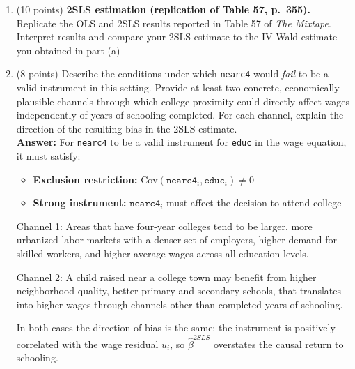 \documentclass[letterpaper,12pt]{article}
\begin{document}
\begin{enumerate}[label=(\alph*)]
\begin{enumerate}[label=(\roman*)]
    \item Using the first-stage regression from (i), report the $F$-statistic on \texttt{nearc4} and comment on whether the instrument appears \textbf{weak}. \\
\textbf{Answer:}
The $F$-statistic on \texttt{nearc4} is approximately $F \approx 15$, exceeding the conventional threshold of $10$.

\end{enumerate}

\item (10 points) \textbf{2SLS estimation (replication of Table 57, p.\ 355).}
Replicate the OLS and 2SLS results reported in Table 57 of \textit{The Mixtape}. Interpret results and compare your 2SLS estimate to the IV-Wald estimate you obtained in part (a)



\item (8 points) Describe the conditions under which \texttt{nearc4} would \emph{fail} to be a valid instrument in this setting. Provide at least two concrete, economically plausible channels through which college proximity could directly affect wages independently of years of schooling completed. For each channel, explain the direction of the resulting bias in the 2SLS estimate.\\
\textbf{Answer:}
\medskip
For \texttt{nearc4} to be a valid instrument for \texttt{educ} in the wage equation, it must satisfy:
\begin{itemize}
    \item \textbf{Exclusion restriction:} $\text{Cov}(\texttt{nearc4}_i, \texttt{educ}_i) \neq 0$
    \item \textbf{Strong instrument:} $\texttt{nearc4}_i$ must affect the decision to attend college 
\end{itemize}

\medskip
Channel 1: Areas that have four-year colleges tend to be larger, more urbanized labor markets with a denser set of employers, higher demand for skilled workers, and higher average wages across all education levels.

Channel 2: A child raised near a college town may benefit from higher neighborhood quality, better primary and secondary schools, that translates into higher wages through channels other than completed years of schooling. 

\medskip
In both cases the direction of bias is the same: the instrument is positively correlated with the wage residual $u_i$, so $\hat{\beta}^{2SLS}$ overstates the causal return to schooling.


\end{enumerate}
\end{document}

